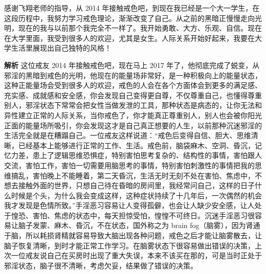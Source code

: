 \begin{case}
    感谢飞翔老师的指导，从 2014 年接触戒色吧，到现在我已经是一个大一学生，在这段历程中，我努力学习戒色理论，渐渐改变了自己。从之前的黑暗正慢慢走向光明，现在的我与以前那个我完全不一样了。我开始勇敢、大方、乐观、自信。现在在大学里面，我受到很多人的欢迎，尤其是女生。人际关系开始好起来，我要在大学生活里展现出自己独特的风格！

    \textbf{解析} 这位戒友 2014 年接触戒色吧，现在马上 2017 年了，他彻底完成了蜕变，从邪淫的黑暗到戒色的光明，他现在的能量场非常好，是一种积极向上的能量状态，这种正能量场会受到很多人的欢迎，戒色的人会在各个方面体会到更多的满足感、充实感、成就感和安全感，你会发现自己变得更自尊，不仅尊重自己，也懂得尊重别人，邪淫状态下常常会把女性当做发泄的工具，那种状态是病态的，让你无法和异性建立正常的人际关系，当你戒色了，你才能真正尊重别人，别人也会被你阳光正面的能量场所吸引，你会发现这才是自己真正想要的人生，以前那种沉迷邪淫的生活完全就是在糟蹋自己。一位戒友这样说道：“戒色后变得自信、胆大、思维清晰，已经基本上能够进行正常的工作、生活。戒色前，脑袋麻木、空洞、昏沉，记忆力差，患上了逻辑思维恐惧症，特别害怕思考复杂的、结构性的事情，害怕跟人交流，害怕工作，害怕一切需要用脑思考的事情，特别害怕刺激性的事情把我的思维搞乱，害怕晚上不能睡着，第二天昏沉，生活无时无刻不处在害怕、焦虑中，不想去接触外面的世界，只想自己待在昏暗的房间里，我经常问自己，这样的日子什么时候是个头，为什么我会变成这样，这种症状持续了十几年后，一次偶然的机会我才发现是色情所致。”手淫恶习容易让人变得孤僻，也会让人缺少安全感，让人处于惶恐、害怕、焦虑的状态中，每天担惊受怕，惶惶不可终日。沉迷手淫恶习很容易让脑子发蒙、麻木、昏沉，不在状态，国外称之为 brain fog（脑雾），因为肾通于脑，所以耗损肾精就容易导致大脑出现各种问题，戒色之后才能让脑雾散去，让脑子恢复清晰，到时才能正常工作学习。在脑雾状态下很容易做出错误的决策，上次一位戒友说自己在买房时出现了重大失误，本来不该买在那的，可是当时正处于邪淫状态，脑子很不清晰，考虑欠妥，结果做了错误的决策。
\end{case}

